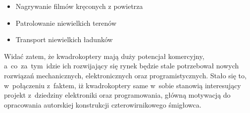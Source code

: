 \begin{itemize}
	\item Nagrywanie filmów kręconych z powietrza
	\item Patrolowanie niewielkich terenów
	\item Transport niewielkich ładunków
\end{itemize}
 
Widać zatem, że kwadrokoptery mają duży potencjał komercyjny, a~co~za~tym~idzie ich rozwijający się rynek będzie stale potrzebował nowych rozwiązań mechanicznych, elektronicznych oraz programistycznych. Stało się to, w~połączeniu z~faktem, iż kwadrokoptery same w~sobie stanowią interesujący projekt z~dziedziny elektroniki oraz programowania, główną motywacją do opracowania autorskiej konstrukcji czterowirnikowego śmigłowca.

 
